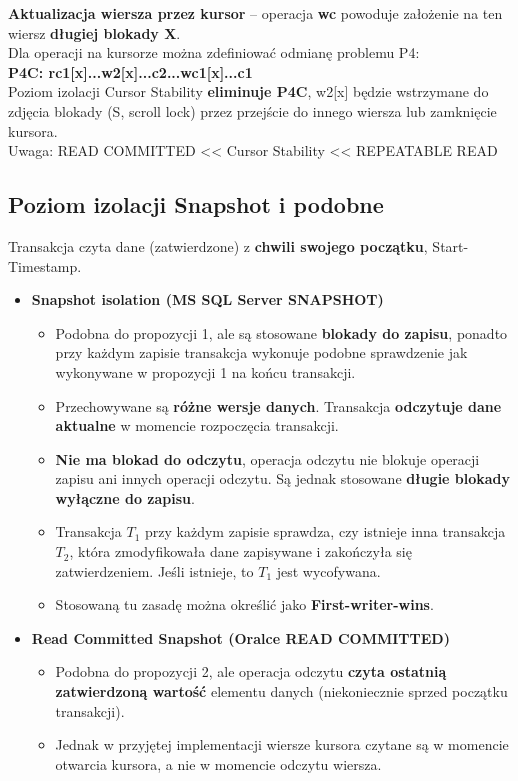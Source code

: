 \documentclass[a4paper]{article}
\begin{document}
\textbf{Aktualizacja wiersza przez kursor} – operacja \textbf{wc} powoduje założenie na ten wiersz \textbf{długiej blokady X}.\\

Dla operacji na kursorze można zdefiniować odmianę problemu P4:\\
\textbf{P4C: rc1[x]...w2[x]...c2...wc1[x]...c1}\\

Poziom izolacji Cursor Stability \textbf{eliminuje P4C}, w2[x] będzie wstrzymane do zdjęcia blokady (S, scroll lock) przez przejście do innego wiersza lub zamknięcie kursora.\\
Uwaga: READ COMMITTED << Cursor Stability << REPEATABLE READ

\subsection{Poziom izolacji Snapshot i podobne}
Transakcja czyta dane (zatwierdzone) z \textbf{chwili swojego
początku}, Start-Timestamp. \\

\begin{itemize}
    \item \textbf{Snapshot isolation (MS SQL Server SNAPSHOT)}
    \begin{itemize}
        \item Podobna do propozycji 1, ale są stosowane \textbf{blokady do zapisu}, ponadto przy każdym zapisie transakcja wykonuje podobne sprawdzenie jak wykonywane w propozycji 1 na końcu transakcji.
        \item Przechowywane są \textbf{różne wersje danych}. Transakcja \textbf{odczytuje dane aktualne} w momencie rozpoczęcia transakcji. 
        \item \textbf{Nie ma blokad do odczytu}, operacja odczytu nie blokuje operacji zapisu ani innych operacji odczytu. Są jednak stosowane \textbf{długie blokady wyłączne do zapisu}.
        \item Transakcja $T_1$ przy każdym zapisie sprawdza, czy istnieje inna transakcja $T_2$, która zmodyfikowała dane zapisywane i zakończyła się zatwierdzeniem. Jeśli istnieje, to $T_1$ jest wycofywana.
        \item Stosowaną tu zasadę można określić jako \textbf{First-writer-wins}.
    \end{itemize}
    \item \textbf{Read Committed Snapshot (Oralce READ COMMITTED)}
    \begin{itemize}
        \item Podobna do propozycji 2, ale operacja odczytu \textbf{czyta ostatnią zatwierdzoną wartość} elementu danych (niekoniecznie sprzed początku transakcji).
        \item Jednak w przyjętej implementacji wiersze kursora czytane są w momencie otwarcia kursora, a nie w momencie odczytu wiersza.
    \end{itemize}
\end{itemize}
\end{document}

